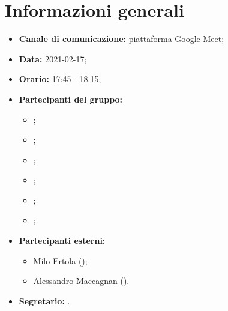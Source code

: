 \section{Informazioni generali}
\begin{itemize}
\item \textbf{Canale di comunicazione:} piattaforma Google Meet;
\item \textbf{Data:} 2021-02-17;
\item \textbf{Orario:} 17:45 - 18.15;
\item \textbf{Partecipanti del gruppo:}
	\begin{itemize}
	\item \MDI ;
	\item \MB ;
	\item \GB ;
	\item \VAS ;
	\item \FD ;
	\item \NM ;
	\end{itemize}
\item \textbf{Partecipanti esterni:}
    \begin{itemize}
    \item Milo Ertola (\Proponente);
    \item Alessandro Maccagnan (\Proponente).
    \end{itemize}
\item \textbf{Segretario:} \MB .

\end{itemize}